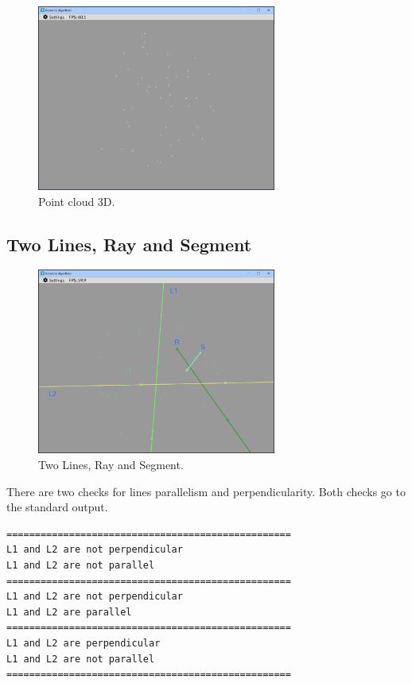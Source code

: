 \documentclass[12pt,a4paper,english]{article}
\begin{document}
\begin{figure}[H]
    \centering
    \includegraphics[width=0.7\textwidth]{p2a-1}
    \caption[]{Point cloud 3D.}
    \label{fig:p2a-1}
\end{figure}

\subsection{Two Lines, Ray and Segment}

\begin{figure}[H]
    \centering
    \includegraphics[width=0.7\textwidth]{p2a-2}
    \caption[]{Two Lines, Ray and Segment.}
    \label{fig:p2a-2}
\end{figure}

There are two checks for lines parallelism and perpendicularity. Both checks go to the standard output.

\begin{verbatim}
==================================================
L1 and L2 are not perpendicular
L1 and L2 are not parallel
==================================================
L1 and L2 are not perpendicular
L1 and L2 are parallel
==================================================
L1 and L2 are perpendicular
L1 and L2 are not parallel
==================================================
\end{verbatim}
\end{document}
